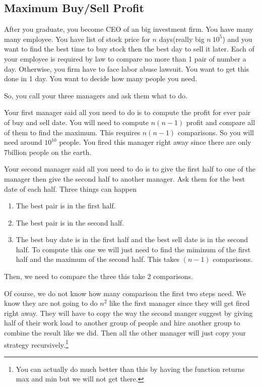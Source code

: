 \documentclass[a4paper, 12pt]{article}
\begin{document}
\begin{multicols}{2}
\section*{Maximum Buy/Sell Profit}
After you graduate, you become CEO of an big investment firm. You have many many employee. You have list of stock price for $n$ days(really big $n~10^5$) and you want to find the best time to buy stock then the best day to sell it later. Each of your employee is required by law to compare no more than 1 pair of number a day. Otherwise, you firm have to face labor abuse lawsuit. You want to get this done in 1 day. You want to decide how many people you need.

So, you call your three managers and ask them what to do.

Your first manager said all you need to do is to compute the profit for ever pair of buy and sell date. You will need to compute $n(n-1)$ profit and compare all of them to find the maximum. This requires $n(n-1)$ comparisons. So you will need around $10^{10}$ people. You fired this manager right away since there are only 7billion people on the earth.

Your second manager said all you need to do is to give the first half to one of the manager then give the second half to another manager. Ask them for the best date of each half. Three things can happen
\begin{enumerate}
	\item The best pair is in the first half.
	\item The best pair is in the second half.
	\item The best buy date is in the first half and the best sell date is in the second half. To compute this one we will just need to find the miminum of the first half and the maximum of the second half. This takes $(n-1)$ comparisons.
\end{enumerate}
Then, we need to compare the three this take 2 comparisons.

Of course, we do not know how many comparison the first two steps need. We know they are not going to do $n^2$ like the first manager since they will get fired right away. They will have to copy the way the second manger suggest by giving half of their work load to another group of people and hire another group to combine the result like we did. Then all the other manager will just copy your strategy recursively.\footnote{You can actually do much better than this by having the function returns max and min but we will not get there.
	}


\end{multicols}
\end{document}
